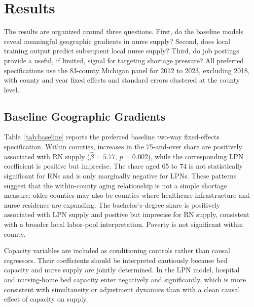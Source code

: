 \documentclass[12pt]{article}
\begin{document}
\section{Results}\label{sec:results}

The results are organized around three questions. First, do the baseline
models reveal meaningful geographic gradients in nurse supply? Second, does
local training output predict subsequent local nurse supply? Third, do job
postings provide a useful, if limited, signal for targeting shortage
pressure? All preferred specifications use the 83-county Michigan panel for
2012 to 2023, excluding 2018, with county and year fixed effects and
standard errors clustered at the county level.

\subsection{Baseline Geographic Gradients}

Table~\ref{tab:baseline} reports the preferred baseline two-way
fixed-effects specification. Within counties, increases in the 75-and-over
share are positively associated with RN supply ($\hat{\beta}=5.77$,
$p=0.002$), while the corresponding LPN coefficient is positive but
imprecise. The share aged 65 to 74 is not statistically significant for RNs
and is only marginally negative for LPNs. These patterns suggest that the
within-county aging relationship is not a simple shortage measure: older
counties may also be counties where healthcare infrastructure and nurse
residence are expanding. The bachelor's-degree share is positively
associated with LPN supply and positive but imprecise for RN supply,
consistent with a broader local labor-pool interpretation. Poverty is not
significant within county.

Capacity variables are included as conditioning controls rather than causal
regressors. Their coefficients should be interpreted cautiously because bed
capacity and nurse supply are jointly determined. In the LPN model,
hospital and nursing-home bed capacity enter negatively and significantly,
which is more consistent with simultaneity or adjustment dynamics than with
a clean causal effect of capacity on supply.
\end{document}
